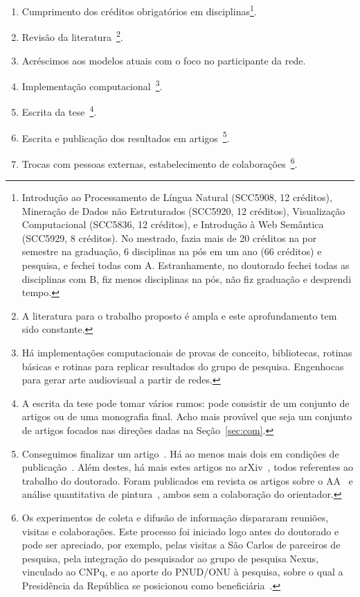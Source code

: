 \documentclass[a4paper,openright,12pt]{report} %
\begin{document}
\begin{enumerate}
	\item Cumprimento dos créditos obrigatórios em disciplinas\footnote{Introdução ao Processamento de Língua Natural (SCC5908, 12 créditos),
        Mineração de Dados não Estruturados (SCC5920, 12 créditos), 
        Visualização Computacional (SCC5836, 12 créditos),
        e Introdução à Web Semântica (SCC5929, 8 créditos).
        No mestrado, fazia mais de 20 créditos na por semestre na graduação,
        6 disciplinas na pós em um ano (66 créditos) e pesquisa, e fechei todas com A.
        Estranhamente, no doutorado fechei todas as disciplinas com B, fiz menos disciplinas na pós,
        não fiz graduação e desprendi tempo.
}.

\item Revisão da literatura~\footnote{A literatura para o trabalho proposto é ampla e este aprofundamento tem sido constante.}.

\item Acréscimos aos modelos atuais com o foco no participante da rede.

\item Implementação computacional~\footnote{Há implementações computacionais de provas de conceito, bibliotecas, rotinas básicas e rotinas para replicar resultados do grupo de pesquisa. Engenhocas para gerar arte audiovisual a partir de redes.}.

\item Escrita da tese~\footnote{A escrita da tese pode tomar vários rumos: pode consistir de um conjunto de artigos ou de uma monografia final. Acho mais provável que seja um conjunto de artigos focados nas direções dadas na Seção~\ref{sec:com}.}.

\item Escrita e publicação dos resultados em artigos~\footnote{Conseguimos finalizar um artigo~\cite{timeS}. Há ao menos mais dois em condições de publicação~\cite{ops,mass}. Além destes, há mais estes artigos no arXiv~\cite{ensaio,rcText,continuousV,versinus}, todos referentes ao trabalho do doutorado. Foram publicados em revista os artigos sobre o AA~\cite{paaper} e análise quantitativa de pintura~\cite{painting}, ambos sem a colaboração do orientador.}.

\item Trocas com pessoas externas, estabelecimento de colaborações~\footnote{Os experimentos de coleta e difusão de informação dispararam reuniões, visitas e colaborações. Este processo foi iniciado logo antes do doutorado e pode ser apreciado, por exemplo, pelas visitas a São Carlos de parceiros de pesquisa, pela integração do pesquisador ao grupo de pesquisa Nexus, vinculado ao CNPq, e ao aporte do PNUD/ONU à pesquisa, sobre o qual a Presidência da República se posicionou como beneficiária~\cite{ensaio}.}.
\end{enumerate}
\end{document}
